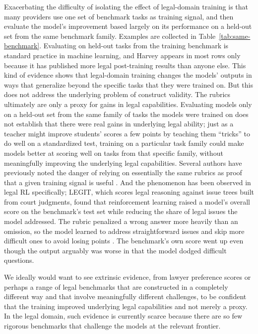 \documentclass[11pt]{article}
\begin{document}
Exacerbating the difficulty of isolating the effect of legal-domain training is that many providers use one set of benchmark tasks as training signal, and then evaluate the model's improvement based largely on its performance on a held-out set from the same benchmark family. Examples are collected in Table~\ref{tab:same-benchmark}. Evaluating on held-out tasks from the training benchmark is standard practice in machine learning, and Harvey appears in most rows only because it has published more legal post-training results than anyone else. This kind of evidence shows that legal-domain training changes the models' outputs in ways that generalize beyond the specific tasks that they were trained on. But this does not address the underlying problem of construct validity. The rubrics ultimately are only a proxy for gains in legal capabilities. Evaluating models only on a held-out set from the same family of tasks the models were trained on does not establish that there were real gains in underlying legal ability; just as a teacher might improve students' scores a few points by teaching them ``tricks'' to do well on a standardized test, training on a particular task family could make models better at scoring well on tasks from that specific family, without meaningfully improving the underlying legal capabilities. Several authors have previously noted the danger of relying on essentially the same rubrics as proof that a given training signal is useful \citep{geirhosShortcut,gaoOveropt,skalseRewardHacking,mahmoudRubricHacking,yangRubricDropout}. And the phenomenon has been observed in legal RL specifically; LEGIT, which scores legal reasoning against issue trees built from court judgments, found that reinforcement learning raised a model's overall score on the benchmark's test set while reducing the share of legal issues the model addressed. The rubric penalized a wrong answer more heavily than an omission, so the model learned to address straightforward issues and skip more difficult ones to avoid losing points \citep{legit}. The benchmark's own score went up even though the output arguably was worse in that the model dodged difficult questions.

We ideally would want to see extrinsic evidence, from lawyer preference scores or perhaps a range of legal benchmarks that are constructed in a completely different way and that involve meaningfully different challenges, to be confident that the training improved underlying legal capabilities and not merely a proxy. In the legal domain, such evidence is currently scarce because there are so few rigorous benchmarks that challenge the models at the relevant frontier.
\end{document}
